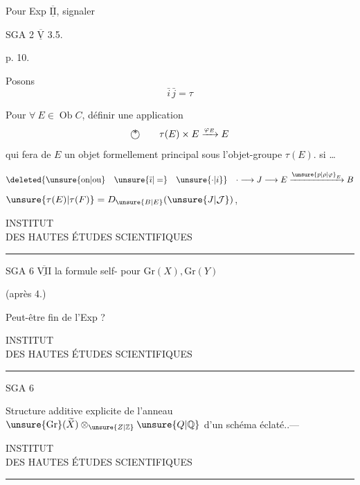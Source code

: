 Pour Exp $\overline{\underline{\mathrm{II}}}$,  signaler

SGA 2 \quad $\overline{\underline{\mathrm{V}}}$ 3.5.

p. 10.

Posons
\[
 \bar i\,\bar j=\tau
\]

Pour $\forall\ E\in\operatorname{Ob}C$,  définir une application
\[
 \text{\textcircled{*}}\qquad
 \tau(E)\times E\xrightarrow{\varphi_E}E
\]
qui fera de $E$ un objet formellement principal sous l'objet-groupe $\tau(E)$.
  si \ldots

\[
 \deleted{\text{\unsure{on|ou}}\quad\unsure{\bar{\imath}|=}\quad\unsure{\cdot|i}}\quad
 \cdot\longrightarrow J\longrightarrow E\xrightarrow{{\unsure{p|\rho|\varphi}}_E}B
\]
 $\unsure{\tau(E)|\tau(F)}=D_{\unsure{B|E}}(\unsure{J|\mathcal{J}})$,

\begin{center}
INSTITUT\\
DES HAUTES ÉTUDES SCIENTIFIQUES\\[-.4ex]
\rule{1.4cm}{.4pt}
\end{center}

SGA 6 $\overline{\underline{\mathrm{VII}}}$ \qquad {} la formule  self- pour $\mathrm{Gr}(X),\mathrm{Gr}(Y)$

(après 4.)

Peut-être fin de l'Exp ?

\begin{center}
INSTITUT\\
DES HAUTES ÉTUDES SCIENTIFIQUES\\[-.4ex]
\rule{1.4cm}{.4pt}
\end{center}

SGA 6

Structure additive explicite
de l'anneau $\unsure{\mathrm{Gr}}(\widetilde X)\otimes_{\unsure{Z|\mathbb Z}}\unsure{Q|\mathbb Q}$ d'un
schéma éclaté..---

\begin{center}
INSTITUT\\
DES HAUTES ÉTUDES SCIENTIFIQUES\\[-.4ex]
\rule{1.4cm}{.4pt}
\end{center}

